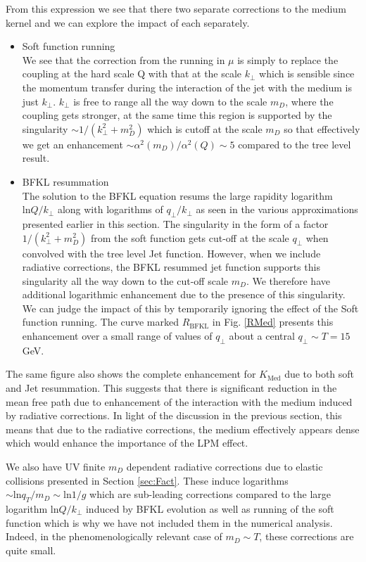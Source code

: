 \documentclass[letter,11pt]{article}
\def\ln{\textrm{ln}}
\begin{document}
From this expression we see that there two separate corrections to the medium kernel and we can explore the impact of each separately.
\begin{itemize}
\item{Soft function running}\\
We see that the correction from the running in $\mu$ is simply to replace the coupling at the hard scale Q with that at the scale $k_{\perp}$ which is sensible since the momentum transfer during the interaction of the jet with the medium is just $k_{\perp}$.  $k_{\perp}$ is free to range all the way down to the scale $m_D$, where the coupling gets stronger, at the same time this region is supported by the singularity $\sim 1/(k_{\perp}^2+m_D^2)$ which is cutoff at the scale $m_D$ so that effectively we get an enhancement $\sim \alpha^2(m_D)/\alpha^2(Q) \sim 5$ compared to the tree level result. 

\item{BFKL resummation}\\ 
The solution to the BFKL equation resums the large rapidity logarithm $ \ln Q/k_{\perp}$ along with logarithms of $q_{\perp}/k_{\perp}$ as seen in the various approximations presented earlier in this section. The singularity in the form of a factor $1/(k_{\perp}^2+m_D^2)$ from the soft function gets cut-off at the scale $q_{\perp}$ when convolved with the tree level Jet function. However, when we include radiative corrections, the BFKL resummed jet function supports this singularity all the way down to the cut-off scale $m_D$. We therefore have additional logarithmic enhancement due to the presence of this singularity. We can judge the impact of this by temporarily ignoring the effect of the Soft function running.  The curve marked $R_{\text{BFKL}}$ in Fig. \ref{RMed} presents this enhancement over a small range of values of $q_{\perp}$ about a central $ q_{\perp} \sim T = 15$ GeV. 
\end{itemize}

The same figure also shows the complete enhancement for $K_{\text{Med}}$ due to both soft and Jet resummation. This suggests that there is significant reduction in the mean free path due to enhancement of the interaction with the medium induced by radiative corrections.
In light of the discussion in the previous section, this means that due to the radiative corrections, the medium effectively appears dense which would enhance the importance of the LPM effect.

 We also have UV finite $m_D$ dependent radiative corrections due to elastic collisions presented in Section \ref{sec:Fact}. These induce logarithms $\sim \ln q_T/m_D \sim \ln 1/g$ which are sub-leading corrections compared to the large logarithm $\ln Q/k_{\perp}$ induced by BFKL evolution as well as running of the soft function which is why we have not included them in the numerical analysis. Indeed, in the phenomenologically relevant case of $m_D \sim T$, these corrections are quite small.
\end{document}
